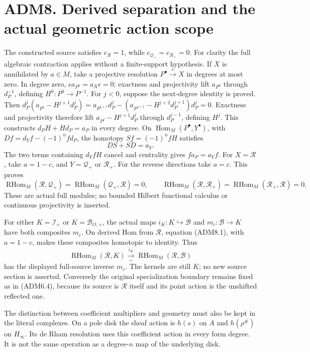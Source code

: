 \section{ADM8. Derived separation and the actual geometric action
scope}\label{adm8.-derived-separation-and-the-actual-geometric-action-scope}

The constructed source satisfies \(c_{\mathcal R}=1\), while
\(c_{\mathcal Q_+}=c_{\mathcal R_+}=0\). For clarity the full algebraic
contraction applies without a finite-support hypothesis. If \(X\) is
annihilated by \(a\in M\), take a projective resolution
\(P^\bullet\xrightarrow{\epsilon}X\) in degrees at most zero. In degree
zero, \(\epsilon a_{P^0}=a_X\epsilon=0\); exactness and projectivity
lift \(a_{P^0}\) through \(d_P^{-1}\), defining \(H^0:P^0\to P^{-1}\).
For \(j<0\), suppose the next-degree identity is proved. Then
\(d_P^j(a_{P^j}-H^{j+1}d_P^j)=a_{P^{j+1}}d_P^j-(a_{P^{j+1}}-H^{j+2}d_P^{j+1})d_P^j=0\).
Exactness and projectivity therefore lift \(a_{P^j}-H^{j+1}d_P^j\)
through \(d_P^{j-1}\), defining \(H^j\). This constructs
\(d_PH+Hd_P=a_P\) in every degree. On
\(\operatorname{Hom}_M(P^\bullet,Y^\bullet)\), with
\(Df=d_Yf-(-1)^nfd_P\), the homotopy \(Sf=(-1)^nfH\) satisfies \[
DS+SD=a_Y.
\tag{ADM8.1}
\] The two terms containing \(d_YfH\) cancel and centrality gives
\(fa_P=a_Yf\). For \(X=\mathcal R\), take \(a=1-c\), and
\(Y=\mathcal Q_+\) or \(\mathcal R_+\). For the reverse directions take
\(a=c\). This proves \[
\operatorname{RHom}_M(\mathcal R,\mathcal Q_+)
=\operatorname{RHom}_M(\mathcal Q_+,\mathcal R)=0,\qquad
\operatorname{RHom}_M(\mathcal R,\mathcal R_+)
=\operatorname{RHom}_M(\mathcal R_+,\mathcal R)=0.
\tag{ADM8.2}
\] These are actual full modules; no bounded Hilbert functional calculus
or continuous projectivity is inserted.

For either \(K=\mathcal I_+\) or \(K=\mathcal B_{O,+}\), the actual maps
\(i_K:K\hookrightarrow\mathcal B\) and \(m_c:\mathcal B\to K\) have both
composites \(m_c\). On derived Hom from \(\mathcal R\), equation
(ADM8.1), with \(a=1-c\), makes these composites homotopic to identity.
Thus \[
\operatorname{RHom}_M(\mathcal R,K)
\xrightarrow[\sim]{\,i_K\,}
\operatorname{RHom}_M(\mathcal R,\mathcal B)
\tag{ADM8.3}
\] has the displayed full-source inverse \(m_c\). The kernels are still
\(K\); no new source section is asserted. Conversely the original
specialization boundary remains fixed as in (ADM6.4), because its source
is \(\mathcal R\) itself and its point action is the unshifted reflected
one.

The distinction between coefficient multipliers and geometry must also
be kept in the literal complexes. On a pole disk the sheaf action is
\(h(s)\) on \(A\) and \(h(\rho^\#)\) on \(H_\infty\). Its de Rham
resolution uses this coefficient action in every form degree. It is not
the same operation as a degree-\(n\) map of the underlying disk.

